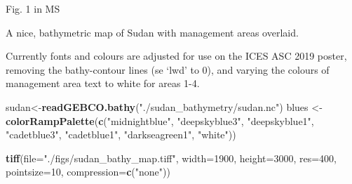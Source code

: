 \documentclass[]{article}
\newenvironment{Shaded}{\begin{snugshade}}{\end{snugshade}}
\newcommand{\KeywordTok}[1]{\textcolor[rgb]{0.13,0.29,0.53}{\textbf{#1}}}
\newcommand{\DataTypeTok}[1]{\textcolor[rgb]{0.13,0.29,0.53}{#1}}
\newcommand{\DecValTok}[1]{\textcolor[rgb]{0.00,0.00,0.81}{#1}}
\newcommand{\StringTok}[1]{\textcolor[rgb]{0.31,0.60,0.02}{#1}}
\newcommand{\NormalTok}[1]{#1}
\begin{document}
Fig. 1 in MS

A nice, bathymetric map of Sudan with management areas overlaid.

Currently fonts and colours are adjusted for use on the ICES ASC 2019
poster, removing the bathy-contour lines (se `lwd' to 0), and varying
the colours of management area text to white for areas 1-4.

\begin{Shaded}
\begin{Highlighting}[]
\NormalTok{sudan<-}\KeywordTok{readGEBCO.bathy}\NormalTok{(}\StringTok{"./sudan_bathymetry/sudan.nc"}\NormalTok{)}
\NormalTok{blues <-}\StringTok{ }\KeywordTok{colorRampPalette}\NormalTok{(}\KeywordTok{c}\NormalTok{(}\StringTok{"midnightblue"}\NormalTok{, }\StringTok{"deepskyblue3"}\NormalTok{, }\StringTok{"deepskyblue1"}\NormalTok{, }\StringTok{"cadetblue3"}\NormalTok{, }\StringTok{"cadetblue1"}\NormalTok{, }\StringTok{"darkseagreen1"}\NormalTok{, }\StringTok{"white"}\NormalTok{))}

\KeywordTok{tiff}\NormalTok{(}\DataTypeTok{file=}\StringTok{"./figs/sudan_bathy_map.tiff"}\NormalTok{, }\DataTypeTok{width=}\DecValTok{1900}\NormalTok{, }\DataTypeTok{height=}\DecValTok{3000}\NormalTok{, }\DataTypeTok{res=}\DecValTok{400}\NormalTok{, }\DataTypeTok{pointsize=}\DecValTok{10}\NormalTok{, }\DataTypeTok{compression=}\KeywordTok{c}\NormalTok{(}\StringTok{"none"}\NormalTok{))}


\end{Highlighting}
\end{Shaded}
\end{document}
